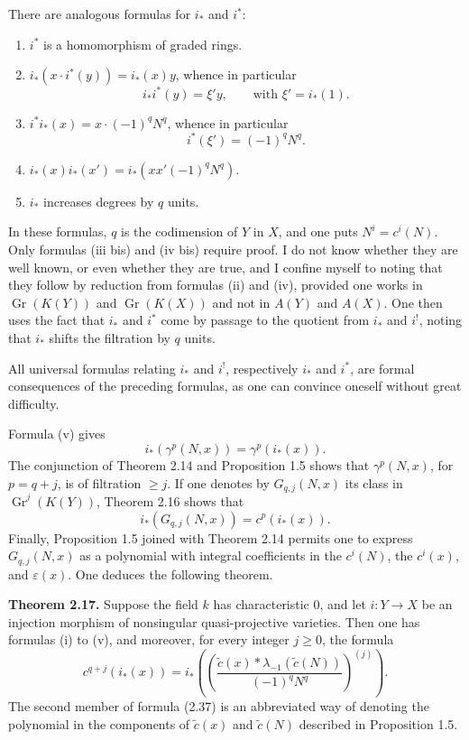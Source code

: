 \documentclass[11pt]{article}
\newcommand{\Gr}{\operatorname{Gr}}
\providecommand{\Gr}{\operatorname{Gr}}
\providecommand{\Gr}{\operatorname{G}}
\begin{document}
There are analogous formulas for $i_*$ and $i^*$:
\begin{enumerate}[label=(\roman* bis)]
\item $i^*$ is a homomorphism of graded rings.
\item $i_*(x\cdot i^*(y))=i_*(x)y$, whence in particular
\[
 i_*i^*(y)=\xi' y,
\qquad \text{with }\xi'=i_*(1).
\]
\item $i^*i_*(x)=x\cdot (-1)^qN^q$, whence in particular
\[
 i^*(\xi')=(-1)^qN^q.
\]
\item $i_*(x)i_*(x')=i_*(xx'(-1)^qN^q)$.
\item $i_*$ increases degrees by $q$ units.
\end{enumerate}
In these formulas, $q$ is the codimension of $Y$ in $X$, and one puts $N^i=c^i(N)$. Only formulas (iii bis) and (iv bis) require proof. I do not know whether they are well known, or even whether they are true, and I confine myself to noting that they follow by reduction from formulas (ii) and (iv), provided one works in $\Gr(K(Y))$ and $\Gr(K(X))$ and not in $A(Y)$ and $A(X)$. One then uses the fact that $i_*$ and $i^*$ come by passage to the quotient from $i_*$ and $i^!$, noting that $i_*$ shifts the filtration by $q$ units.

All universal formulas relating $i_*$ and $i^!$, respectively $i_*$ and $i^*$, are formal consequences of the preceding formulas, as one can convince oneself without great difficulty.

Formula (v) gives
\[
 i_*(\gamma^p(N,x))=\gamma^p(i_*(x)).
\]
The conjunction of Theorem 2.14 and Proposition 1.5 shows that $\gamma^p(N,x)$, for $p=q+j$, is of filtration $\geq j$. If one denotes by $G_{q,j}(N,x)$ its class in $\Gr^j(K(Y))$, Theorem 2.16 shows that
\[
 i_*(G_{q,j}(N,x))=c^p(i_*(x)).
\]
Finally, Proposition 1.5 joined with Theorem 2.14 permits one to express $G_{q,j}(N,x)$ as a polynomial with integral coefficients in the $c^i(N)$, the $c^i(x)$, and $\varepsilon(x)$. One deduces the following theorem.

\textbf{Theorem 2.17.} Suppose the field $k$ has characteristic $0$, and let $i:Y\to X$ be an injection morphism of nonsingular quasi-projective varieties. Then one has formulas (i) to (v), and moreover, for every integer $j\geq 0$, the formula
\begin{equation}\tag{2.37}
 c^{q+j}(i_*(x))=
 i_*\left(\left(\frac{\widetilde c(x)*\lambda_{-1}(\widetilde c(N))}{(-1)^qN^q}\right)^{(j)}\right).
\end{equation}
The second member of formula (2.37) is an abbreviated way of denoting the polynomial in the components of $\widetilde c(x)$ and $\widetilde c(N)$ described in Proposition 1.5.
\end{document}
